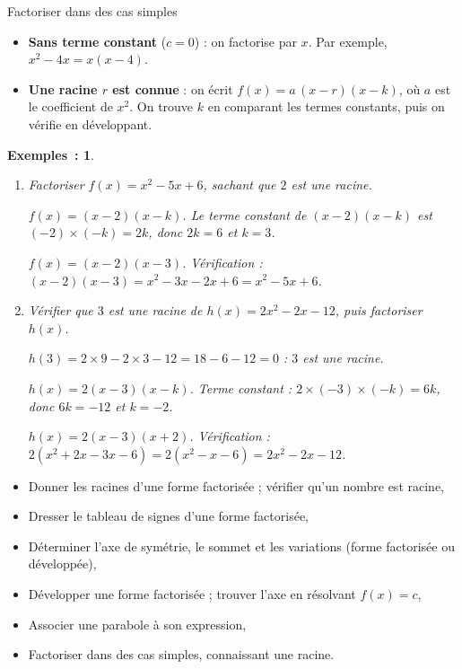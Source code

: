 \documentclass[12pt]{article}
\theoremstyle{break}
\newtheorem*{examples}{Exemples~:}
\theoremstyle{inline}
\begin{document}
\begin{method}{Factoriser dans des cas simples}{}
  \begin{itemize}
    \item \textbf{Sans terme constant} ($c = 0$) : on factorise par $x$. Par exemple, $x^2 - 4x = x(x - 4)$.
    \item \textbf{Une racine $r$ est connue} : on écrit $f(x) = a\,(x - r)(x - k)$, où $a$ est le coefficient de $x^2$. On trouve $k$ en comparant les termes constants, puis on vérifie en développant.
  \end{itemize}
\end{method}

\begin{examples}
  \begin{enumerate}
    \item Factoriser $f(x) = x^2 - 5x + 6$, sachant que $2$ est une racine.
    \begin{multihideW}[0.5em]
      $f(x) = (x - 2)(x - k)$. Le terme constant de $(x - 2)(x - k)$ est $(-2) \times (-k) = 2k$, donc $2k = 6$ et $k = 3$.

      $f(x) = (x - 2)(x - 3)$. Vérification : $(x - 2)(x - 3) = x^2 - 3x - 2x + 6 = x^2 - 5x + 6$.
    \end{multihideW}

    \item Vérifier que $3$ est une racine de $h(x) = 2x^2 - 2x - 12$, puis factoriser $h(x)$.
    \begin{multihideW}[0.5em]
      $h(3) = 2 \times 9 - 2 \times 3 - 12 = 18 - 6 - 12 = 0$ : $3$ est une racine.

      $h(x) = 2(x - 3)(x - k)$. Terme constant : $2 \times (-3) \times (-k) = 6k$, donc $6k = -12$ et $k = -2$.

      $h(x) = 2(x - 3)(x + 2)$. Vérification : $2(x^2 + 2x - 3x - 6) = 2(x^2 - x - 6) = 2x^2 - 2x - 12$.
    \end{multihideW}
  \end{enumerate}
\end{examples}

\vfill

\begin{savoir}{}{}
\begin{itemize}[label=--]
  \item Donner les racines d'une forme factorisée ; vérifier qu'un nombre est racine,
  \item Dresser le tableau de signes d'une forme factorisée,
  \item Déterminer l'axe de symétrie, le sommet et les variations (forme factorisée ou développée),
  \item Développer une forme factorisée ; trouver l'axe en résolvant $f(x) = c$,
  \item Associer une parabole à son expression,
  \item Factoriser dans des cas simples, connaissant une racine.
\end{itemize}
\end{savoir}
\end{document}
